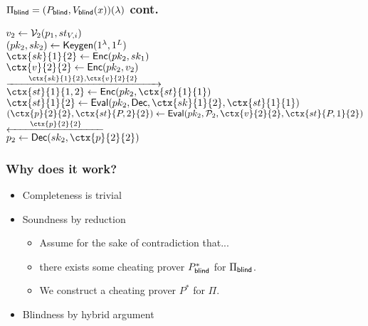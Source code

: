 \documentclass{beamer}
\begin{document}
\begin{frame}
	\frametitle{$\Pi_{\mathsf{blind}}=(P_{\mathsf{blind}}, V_{\mathsf{blind}}(x))(\lambda)$ cont.}
	$v_2\leftarrow\mathcal{V}_2(p_{1}, st_{V, i})$
	\pause
	\\$(pk_2, sk_2)\leftarrow\mathsf{Keygen}(1^\lambda, 1^L)$
	\pause
	\\$\ctx{sk}{1}{2}\leftarrow\Enc(pk_2, sk_{1})$
	\pause
	\\$\ctx{v}{2}{2}\leftarrow\Enc(pk_2, v_2)$
	\pause
	\\\hspace*{\fill}$\xrightarrow{\qquad \ctx{sk}{1}{2}, \ctx{v}{2}{2}\qquad}$\hspace*{\fill}
	\pause
	\\\hspace*{\fill}$\ctx{st}{1}{1, 2}\leftarrow\Enc(pk_2, \ctx{st}{1}{1})$
	\pause
	\\\hspace*{\fill}$\ctx{st}{1}{2}\leftarrow\Eval(pk_2, \Dec, \ctx{sk}{1}{2}, \ctx{st}{1}{1})$
	\pause
	\\\hspace*{\fill}$(\ctx{p}{2}{2}, \ctx{st}{P, 2}{2})\leftarrow\Eval(pk_2, \cP_2, \ctx{v}{2}{2}, \ctx{st}{P, 1}{2})$
	\pause
	\\\hspace*{\fill}$\xleftarrow{\qquad \ctx{p}{2}{2}\qquad}$\hspace*{\fill}
	\pause
	\\$p_2\leftarrow\Dec(sk_2, \ctx{p}{2}{2})$
\end{frame}

\begin{frame}
	\frametitle{Why does it work?}
	\begin{itemize}[<+->]
		\item Completeness is trivial
		\item Soundness by reduction
			\begin{itemize}[<+->]
				\item Assume for the sake of contradiction that...
				\item there exists some cheating prover $P_{\mathsf{blind}}^*$ for $\Pi_{\mathsf{blind}}$.
				\item We construct a cheating prover $P^*$ for $\Pi$.
			\end{itemize}
		\item Blindness by hybrid argument
	\end{itemize}
\end{frame}
\end{document}
